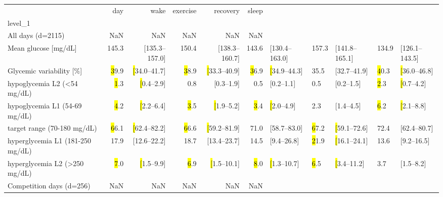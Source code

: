 \begin{tabular}{lrrrrr}
\toprule
{} &                        day &                       wake &                   exercise &                   recovery &                      sleep \\
level_1                                      &                            &                            &                            &                            &                            \\
\midrule
All days (d=2115)                            &                        NaN &                        NaN &                        NaN &                        NaN &                        NaN \\
Mean glucose [mg/dL]                         &     145.3 & [135.3--157.0] &     150.4 & [138.3--160.7] &     143.6 & [130.4--163.0] &     157.3 & [141.8--165.1] &     134.9 & [126.1--143.5] \\
Glycemic variability [\%]                    &  \hl39.9 & \hl[34.0--41.7] &  \hl38.9 & \hl[33.3--40.9] &  \hl36.9 & \hl[34.9--44.3] &        35.5 & [32.7--41.9] &  \hl40.3 & \hl[36.0--46.8] \\
\hspace{7mm}hypoglycemia L2 (<54 mg/dL)      &     \hl1.3 & \hl[0.4--2.9] &           0.8 & [0.3--1.9] &           0.5 & [0.2--1.1] &           0.5 & [0.2--1.5] &     \hl2.3 & \hl[0.7--4.2] \\
\hspace{7mm}hypoglycemia L1 (54-69 mg/dL)    &     \hl4.2 & \hl[2.2--6.4] &     \hl3.5 & \hl[1.9--5.2] &     \hl3.4 & \hl[2.0--4.9] &           2.3 & [1.4--4.5] &     \hl6.2 & \hl[2.1--8.8] \\
\hspace{7mm}target range (70-180 mg/dL)      &  \hl66.1 & \hl[62.4--82.2] &  \hl66.6 & \hl[59.2--81.9] &        71.0 & [58.7--83.0] &  \hl67.2 & \hl[59.1--72.6] &        72.4 & [62.4--80.7] \\
\hspace{7mm}hyperglycemia L1 (181-250 mg/dL) &        17.9 & [12.6--22.2] &        18.7 & [13.4--23.7] &         14.5 & [9.4--26.8] &  \hl21.9 & \hl[16.1--24.1] &         13.6 & [9.2--16.5] \\
\hspace{7mm}hyperglycemia L2 (>250 mg/dL)    &     \hl7.0 & \hl[1.5--9.9] &    \hl6.9 & \hl[1.5--10.1] &    \hl8.0 & \hl[1.3--10.7] &    \hl6.5 & \hl[3.4--11.2] &           3.7 & [1.5--8.2] \\
Competition days (d=256)                     &                        NaN &                        NaN &                        NaN &                        NaN &                        NaN \\

\end{tabular}
